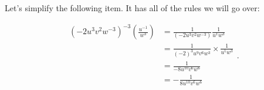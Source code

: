 \label{les_2_unit_3:power_product_quotient_rules}

Let’s simplify the following item. It has all of the rules we will go over:

\begin{equation}
  \label{spt:power_product_quotient_rules}
  \begin{split}
    (-2u^{3}v^{2}w^{-3})^{-3} \left(\frac{u^{-1}}{w^{3}}\right)
    &= \frac{1}{(-2u^{3}v^{2}w^{-3})} \frac{1}{u^{1}w^{3}} \\
    &= \frac{1}{(-2)^{3}u^{9}v^{6}w^{3}} \times \frac{1}{u^{1}w^{3}} \\
    &= \frac{1}{-8u^{10}v^{6}w^{6}} \\
    &= - \frac{1}{8u^{10}v^{6}w^{6}} \\
  \end{split}
.\end{equation}

\newpage
